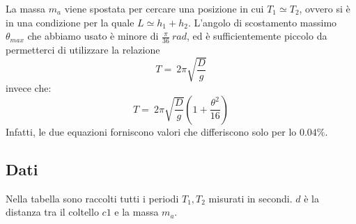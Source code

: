 La massa $m_a$ viene spostata per cercare una posizione in cui $T_1 \simeq T_2$, ovvero si è in una condizione per la quale $L\simeq h_1+h_2$. 
L'angolo di scostamento massimo $\theta_{max}$ che abbiamo usato è minore di $\frac{\pi}{36} \ rad$, ed è sufficientemente piccolo da permetterci di utilizzare la relazione 
$$ T = \ 2 \pi \sqrt{\frac{D}{g}}$$
invece che:
$$ T = \ 2 \pi \sqrt{\frac{D}{g}} \left( 1 + \frac{\theta^2}{16}\right)$$
Infatti, le due equazioni forniscono valori che differiscono solo per lo $0.04\% $.

\subsection{Dati}
Nella tabella sono raccolti tutti i periodi $T_1,T_2$ misurati in secondi. $d$ è la distanza tra il coltello $c1$ e la massa $m_a$.
